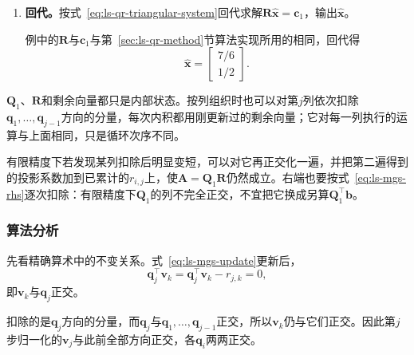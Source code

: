 \begin{enumerate}
 这时$j=d$，结束，得
 \[
  \bm R=\begin{bmatrix}\sqrt3&\sqrt3\\0&\sqrt2\end{bmatrix},\qquad
  \bm c_1=\begin{bmatrix}5/\sqrt3\\1/\sqrt2\end{bmatrix}.
 \]
 可以核验
 \[
  \bm q_1^\top\bm q_2=0,\qquad
  \sqrt3\,\bm q_1+\sqrt2\,\bm q_2=\begin{bmatrix}0\\1\\2\end{bmatrix}=\bm a_2 .
 \]
 第二式正是$\bm R$第二列的含义：$\bm a_2$沿$\bm q_1$的分量为$\sqrt3$，剩余部分长度为$\sqrt2$。

 最后剩下的$\bm s$正是直线拟合的残差，长度为$1/\sqrt6$。

 \item \textbf{回代。}按式~\eqref{eq:ls-qr-triangular-system}回代求解$\bm R\hat{\bm x}=\bm c_1$，输出$\hat{\bm x}$。

 例中的$\bm R$与$\bm c_1$与第~\ref{sec:ls-qr-method}节算法实现所用的相同，回代得
 \[
  \hat{\bm x}=\begin{bmatrix}7/6\\1/2\end{bmatrix}.
 \]
\end{enumerate}

$\bm Q_1$、$\bm R$和剩余向量都只是内部状态。按列组织时也可以对第$j$列依次扣除$\bm q_1,\ldots,\bm q_{j-1}$方向的分量，每次内积都用刚更新过的剩余向量；它对每一列执行的运算与上面相同，只是循环次序不同。

有限精度下若发现某列扣除后明显变短，可以对它再正交化一遍，并把第二遍得到的投影系数加到已累计的$r_{i,j}$上，使$\bm A=\bm Q_1\bm R$仍然成立。右端也要按式~\eqref{eq:ls-mgs-rhs}逐次扣除：有限精度下$\bm Q_1$的列不完全正交，不宜把它换成另算$\bm Q_1^\top\bm b$。

\subsubsection{算法分析}
先看精确算术中的不变关系。式~\eqref{eq:ls-mgs-update}更新后，
\[
  \bm q_j^\top\bm v_k=\bm q_j^\top\bm v_k-r_{j,k}=0 ,
\]
即$\bm v_k$与$\bm q_j$正交。

扣除的是$\bm q_j$方向的分量，而$\bm q_j$与$\bm q_1,\ldots,\bm q_{j-1}$正交，所以$\bm v_k$仍与它们正交。因此第$j$步归一化的$\bm v_j$与此前全部方向正交，各$\bm q_i$两两正交。

